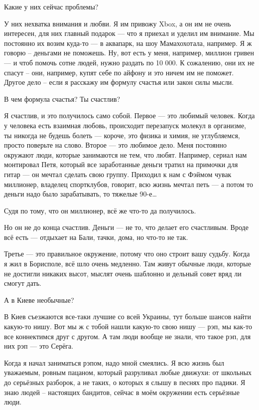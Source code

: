 Какие у них сейчас проблемы?

У них нехватка внимания и любви. Я им привожу Xbox, а он им не очень интересен,
для них главный подарок --- что я приехал и уделил им внимание. Мы постоянно их
возим куда-то --- в аквапарк, на шоу Мамахохотала, например. Я ж говорю –
деньгами не поможешь. Ну, вот есть у меня, например, миллион гривен --- и чтоб
помочь сотне людей, нужно раздать по 10 000. К сожалению, они их не спасут –
они, например, купят себе по айфону и это ничем им не поможет. Другое дело –
если я расскажу им формулу счастья или закон силы мысли.

В чем формула счастья? Ты счастлив?

Я счастлив, и это получилось само собой. Первое --- это любимый человек. Когда у
человека есть взаимная любовь, происходит перезапуск молекул в организме, ты
никогда не будешь болеть --- короче, это физика и химия, не углубляемся, просто
поверьте на слово. Второе --- это любимое дело. Меня постоянно окружают люди,
которые занимаются не тем, что любят. Например, сериал нам монтировал Петя,
который все заработанные деньги тратил на примочки для гитар --- он мечтал
сделать свою группу. Приходил к нам с Фэймом чувак миллионер, владелец
спортклубов, говорит, всю жизнь мечтал петь --- а потом то деньги надо было
зарабатывать, то тяжелые 90-е…

Судя по тому, что он миллионер, всё же что-то да получилось.

Но он не до конца счастлив. Деньги --- не то, что делает его счастливым. Вроде
всё есть --- отдыхает на Бали, тачки, дома, но что-то не так.

Третье --- это правильное окружение, потому что оно строит вашу судьбу. Когда я
жил в Борисполе, всё шло очень медленно. Там живут обычные люди, которые не
достигли никаких высот, мыслят очень шаблонно и дельный совет вряд ли смогут
дать.

А в Киеве необычные?

В Киев съезжаются все-таки лучшие со всей Украины, тут больше шансов найти
какую-то нишу. Вот мы ж с тобой нашли какую-то свою нишу --- рэп, мы как-то все
коннектимся друг с другом. А там люди вообще не знали, что такое рэп, для них
рэп --- это Серёга.

Когда я начал заниматься рэпом, надо мной смеялись. Я всю жизнь был уважаемым,
ровным пацаном, который разруливал любые движухи: от школьных до серьёзных
разборок, а не таких, о которых я слышу в песнях про падики. Я знаю людей –
настоящих бандитов, сейчас в моём окружении есть серьёзные люди.


